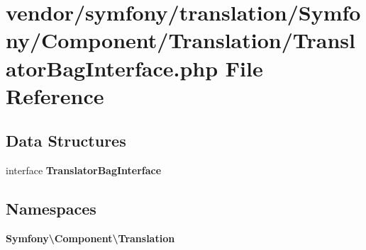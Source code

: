 \section{vendor/symfony/translation/\+Symfony/\+Component/\+Translation/\+Translator\+Bag\+Interface.php File Reference}
\label{_translator_bag_interface_8php}
\subsection*{Data Structures}
\begin{DoxyCompactItemize}
\item 
interface {\bf Translator\+Bag\+Interface}
\end{DoxyCompactItemize}
\subsection*{Namespaces}
\begin{DoxyCompactItemize}
\item 
 {\bf Symfony\textbackslash{}\+Component\textbackslash{}\+Translation}
\end{DoxyCompactItemize}
